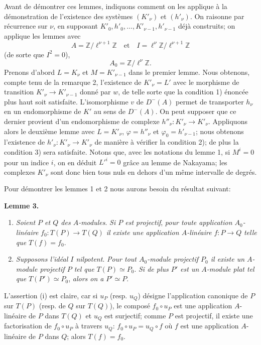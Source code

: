 \documentclass[11pt]{article}
\newenvironment{statement}[1]{\par\medskip\noindent\textbf{#1.}\ }{\par\medskip}
\begin{document}
Avant de démontrer ces lemmes, indiquons comment on les applique à la démonstration de l'existence des systèmes $(K'_\nu)$ et $(h'_\nu)$. On raisonne par récurrence sur $\nu$, en supposant $K'_0,h'_0,\ldots,K'_{\nu-1},h'_{\nu-1}$ déjà construits; on applique les lemmes avec
\[
A=\mathbb Z/\ell^{\nu+1}\mathbb Z
\quad\text{et}\quad
I=\ell^\nu\mathbb Z/\ell^{\nu+1}\mathbb Z
\]
(de sorte que $I^2=0$),
\[
A_0=\mathbb Z/\ell^\nu\mathbb Z.
\]
Prenons d'abord $L=K_\nu$ et $M=K'_{\nu-1}$ dans le premier lemme. Nous obtenons, compte tenu de la remarque 2, l'existence de $K'_\nu=L'$ avec le morphisme de transition $K'_\nu\to K'_{\nu-1}$ donné par $w$, de telle sorte que la condition 1) énoncée plus haut soit satisfaite. L'isomorphisme $v$ de $D^-(A)$ permet de transporter $h_\nu$ en un endomorphisme de $K'$ au sens de $D^-(A)$. On peut supposer que ce dernier provient d'un endomorphisme de complexe $h''_\nu:K'_\nu\to K'_\nu$. Appliquons alors le deuxième lemme avec $L=K'_\nu$, 
$\varphi=h''_\nu$ et $\varphi_0=h'_{\nu-1}$;
nous obtenons l'existence de $h'_\nu:K'_\nu\to K'_\nu$ de manière à vérifier la condition 2); de plus la condition 3) sera satisfaite. Notons que, avec les notations du lemme 1, si $M^i=0$ pour un indice $i$, on en déduit $L'^i=0$ grâce au lemme de Nakayama; les complexes $K'_\nu$ sont donc bien tous nuls en dehors d'un même intervalle de degrés.

Pour démontrer les lemmes 1 et 2 nous aurons besoin du résultat suivant:

\begin{statement}{Lemme 3}
\begin{enumerate}[label=(\roman*)]
\item \emph{Soient $P$ et $Q$ des $A$-modules}. \emph{Si $P$ est projectif}, \emph{pour toute application $A_0$-linéaire} $f_0:T(P)\to T(Q)$ \emph{il existe une application $A$-linéaire} $f:P\to Q$ \emph{telle que} $T(f)=f_0$.
\item \emph{Supposons l'idéal $I$ nilpotent}. \emph{Pour tout $A_0$-module projectif $P_0$ il existe un $A$-module projectif $P$ tel que} $T(P)\simeq P_0$. \emph{Si de plus $P'$ est un $A$-module plat tel que} $T(P')\simeq P_0$, \emph{alors on a} $P'\simeq P$.
\end{enumerate}
\end{statement}

L'assertion (i) est claire, car si $u_P$ (resp. $u_Q$) désigne l'application canonique de $P$ sur $T(P)$ (resp. de $Q$ sur $T(Q)$), le composé $f_0\circ u_P$ est une application $A$-linéaire de $P$ dans $T(Q)$ et $u_Q$ est surjectif; comme $P$ est projectif, il existe une factorisation de $f_0\circ u_P$ à travers $u_Q$: $f_0\circ u_P=u_Q\circ f$ où $f$ est une application $A$-linéaire de $P$ dans $Q$; alors $T(f)=f_0$.
\end{document}
